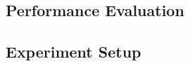 \documentclass[handout]{beamer}
\begin{document}
\begin{CJK}{UTF8}{bkai}



            \section{Performance Evaluation}
            \subsection{Experiment Setup}


\end{CJK}
\end{document}
